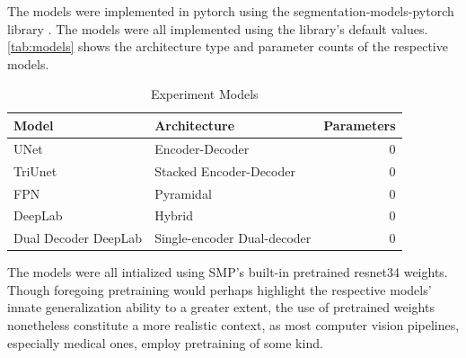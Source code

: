The models were implemented in pytorch using the segmentation-models-pytorch library \cite{smp}. The models were all implemented using the library's default values. \autoref{tab:models} shows the architecture type and parameter counts of the respective models. 
  \begin{table}[h]
            \centering
            \begin{tabularx}{\linewidth}{lXr}
            \toprule
                 Model & Architecture & Parameters  \\
            \midrule
                 UNet & Encoder-Decoder & 0\\ 
                 TriUnet & Stacked Encoder-Decoder & 0\\
                 FPN & Pyramidal & 0\\ 
                 DeepLab & Hybrid & 0\\ 
                 Dual Decoder DeepLab & Single-encoder Dual-decoder & 0\\
            \bottomrule
            \end{tabularx}
            \caption{Experiment Models}
            \label{tab:baselines}
        \end{table}
The models were all intialized using SMP's built-in pretrained resnet34 weights. Though foregoing pretraining would perhaps highlight the respective models' innate generalization ability to a greater extent, the use of pretrained weights nonetheless constitute a more realistic context, as most computer vision pipelines, especially medical ones, employ pretraining of some kind. 

